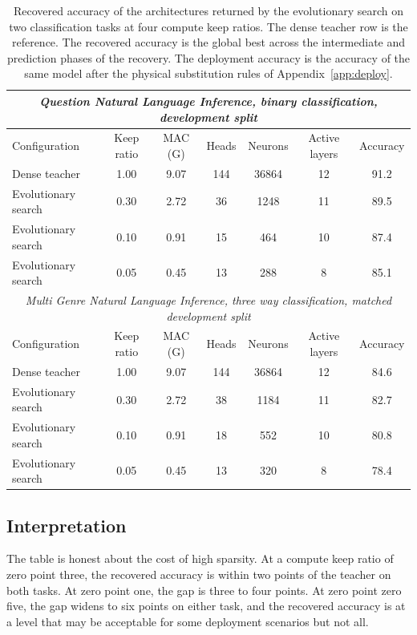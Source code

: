 \begin{table}[h]
\centering
\caption{Recovered accuracy of the architectures returned by the evolutionary search on two classification tasks at four compute keep ratios. The dense teacher row is the reference. The recovered accuracy is the global best across the intermediate and prediction phases of the recovery. The deployment accuracy is the accuracy of the same model after the physical substitution rules of Appendix~\ref{app:deploy}.}
\label{tab:headline}
\begin{tabular}{lcccccc}
\toprule
\multicolumn{7}{c}{\textit{Question Natural Language Inference, binary classification, development split}} \\
\midrule
Configuration & Keep ratio & MAC (G) & Heads & Neurons & Active layers & Accuracy \\
\midrule
Dense teacher                & 1.00 & 9.07 & 144 & 36864 & 12 & 91.2 \\
Evolutionary search          & 0.30 & 2.72 & 36 & 1248 & 11 & 89.5 \\
Evolutionary search          & 0.10 & 0.91 & 15 & 464 & 10 & 87.4 \\
Evolutionary search          & 0.05 & 0.45 & 13 & 288 & 8  & 85.1 \\
\midrule
\multicolumn{7}{c}{\textit{Multi Genre Natural Language Inference, three way classification, matched development split}} \\
\midrule
Configuration & Keep ratio & MAC (G) & Heads & Neurons & Active layers & Accuracy \\
\midrule
Dense teacher                & 1.00 & 9.07 & 144 & 36864 & 12 & 84.6 \\
Evolutionary search          & 0.30 & 2.72 & 38 & 1184 & 11 & 82.7 \\
Evolutionary search          & 0.10 & 0.91 & 18 & 552 & 10 & 80.8 \\
Evolutionary search          & 0.05 & 0.45 & 13 & 320 & 8  & 78.4 \\
\bottomrule
\end{tabular}
\end{table}

\subsection{Interpretation}

The table is honest about the cost of high sparsity. At a compute keep ratio of zero point three, the recovered accuracy is within two points of the teacher on both tasks. At zero point one, the gap is three to four points. At zero point zero five, the gap widens to six points on either task, and the recovered accuracy is at a level that may be acceptable for some deployment scenarios but not all.

